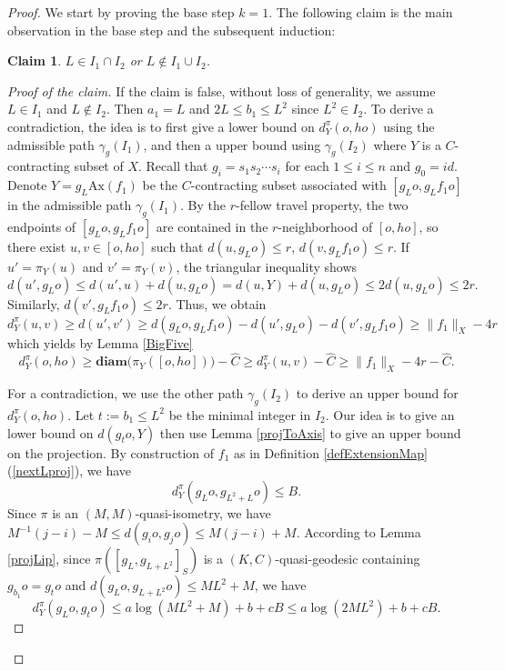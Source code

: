 \documentclass{amsart}
\numberwithin{thm}{section}
\numberwithin{figure}{section}
\newtheorem{claim}[thm]{Claim}
\theoremstyle{definition}
\theoremstyle{definition}
\theoremstyle{remark}
\newcommand{\ax}{\mathrm{Ax}}
\newcommand{\diam }[1]{{\textbf{diam}\big(#1\big)}}
\numberwithin{equation}{section}
\theoremstyle{plain}
\begin{document}
\begin{proof}
	We start by proving  the base step   $k=1$. The following claim is the main observation in the base step and the subsequent induction:
	\begin{claim}
		$L\in I_1 \cap I_2$ or $L\not\in I_1\cup I_2$.
	\end{claim}
	\begin{proof}[Proof of the claim]
		If the claim is false, without loss of generality, we assume $L\in I_1$ and $L\not\in I_2$. Then $a_1 = L$ and $2L\le b_1 \le L^2$ since $L^2\in I_2$. To derive a contradiction, the idea is to first give a lower bound on  $d^{\pi}_Y(o, h o)$ using  the admissible path   $\gamma_g(I_1)$, and then a upper bound using     $\gamma_g(I_2)$ where $Y$ is a $C$-contracting subset of $X$.
		Recall that $g_i = s_1 s_2\cdots s_i$ for each $1\le i\le n$ and $g_0 = id$. Denote $Y = g_L \ax(f_1)$ be the $C$-contracting subset associated with $[g_L o, g_L f_1 o]$ in the admissible path   $\gamma_g(I_1)$.   By the $r$-fellow travel property, the two endpoints of  $[g_L o, g_L f_1 o]$ are contained in the $r$-neighborhood of   $[o, ho]$, so there exist  $u, v\in [o, ho]$ such that $d(u, g_L o)\le r$, $d(v, g_L f_1 o)\le r$. If  $u' = \pi_Y(u)$ and $v' = \pi_Y(v)$, the triangular inequality shows $$d(u', g_L o)\le d(u', u) + d(u, g_L o) = d(u, Y) + d(u, g_L o)\le 2 d(u, g_L o) \le 2r.$$ Similarly, $d(v', g_L f_1 o)\le 2r$. Thus, we obtain   $$d^{\pi}_Y(u, v) \ge d(u', v') \ge d(g_L o, g_L f_1 o) - d(u', g_L o) - d(v', g_L f_1 o) \ge \|f_1\|_X - 4r$$ which yields   by Lemma \ref{BigFive}  \begin{equation}\label{lowerProj}
			d^{\pi}_Y(o, h o) \ge \diam{\pi_Y([o, ho])} - \hat C \ge d^{\pi}_Y(u, v) - \hat C \ge \|f_1\|_X - 4r - \hat C.
		\end{equation}
		
		For a contradiction, we  use the other   path   $\gamma_g(I_2)$ to derive an upper bound for $d^{\pi}_Y(o, h o)$. Let $t:=b_1\le L^2 $ be the minimal integer in $I_2$. Our idea is to give an lower bound on $d(g_t o, Y)$ then use Lemma \ref{projToAxis} to give an upper bound on the projection. By construction of $f_1$ as in Definition \ref{defExtensionMap}(\ref{nextLproj}), we have $$d^{\pi}_Y(g_L o, g_{L^2+L} o) \le B.$$
		 Since $\pi$ is an $(M, M)$-quasi-isometry, we have $M^{-1}(j-i) - M\le d(g_i o, g_j o)\le M(j-i) + M$. According to   Lemma \ref{projLip}, since $\pi([g_L, g_{L+L^2}]_S)$ is a $(K, C)$-quasi-geodesic containing $g_{b_1}o=g_to$ and $d(g_L o, g_{L+L^2} o)\le M L^2 + M$, we have $$d^{\pi}_Y (g_L o, g_{t} o) \le a\log(ML^2 + M) + b + cB \le a\log(2ML^2) + b + cB.$$ 
        

\end{proof}
\end{proof}
\end{document}
